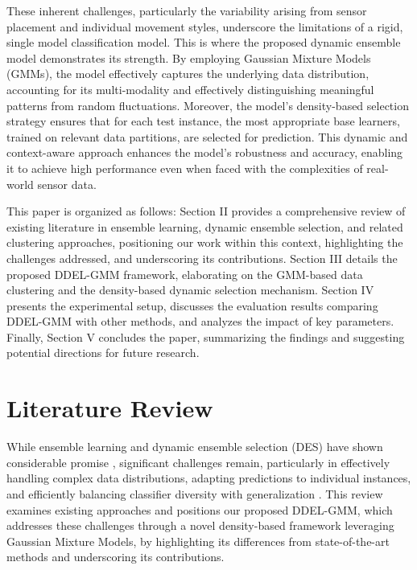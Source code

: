 \documentclass[lettersize,journal]{IEEEtran}
\newcommand{\greenhighlight}[1]{\textcolor{highlightgreen}{#1}}
\begin{document}
	These inherent challenges, particularly the variability arising from sensor placement and individual movement styles, underscore the limitations of a rigid, single model classification model.
	 This is where the proposed dynamic ensemble model demonstrates its strength. By employing Gaussian Mixture Models (GMMs), the model effectively captures the underlying data distribution, accounting for its multi-modality and effectively distinguishing meaningful patterns from random fluctuations. Moreover, the model’s density-based selection strategy ensures that for each test instance, the most appropriate base learners, trained on relevant data partitions, are selected for prediction. This dynamic and context-aware approach enhances the model's robustness and accuracy, enabling it to achieve high performance even when faced with the complexities of real-world sensor data.
	
	\greenhighlight{
		This paper is organized as follows: 
		Section II provides a comprehensive review of existing literature in ensemble learning, dynamic ensemble selection, and related clustering approaches, positioning our work within this context, highlighting the challenges addressed, and underscoring its contributions. Section III details the proposed DDEL-GMM framework, elaborating on the GMM-based data clustering and the density-based dynamic selection mechanism. Section IV presents the experimental setup, discusses the evaluation results comparing DDEL-GMM with other methods, and analyzes the impact of key parameters. Finally, Section V concludes the paper, summarizing the findings and suggesting potential directions for future research.
	}

\section{Literature Review}\label{sec:literature}
\greenhighlight{While ensemble learning and dynamic ensemble selection (DES) have shown considerable promise \cite{nguyen_ensemble_2020, zhang_distance-based_2019, cruz_dynamic_2018}, significant challenges remain, particularly in effectively handling complex data distributions, adapting predictions to individual instances, and efficiently balancing classifier diversity with generalization \cite{ditzler_learning_2015, lessmann_benchmarking_2015}. This review examines existing approaches and positions our proposed DDEL-GMM, which addresses these challenges through a novel density-based framework leveraging Gaussian Mixture Models, by highlighting its differences from state-of-the-art methods and underscoring its contributions.}
\end{document}
